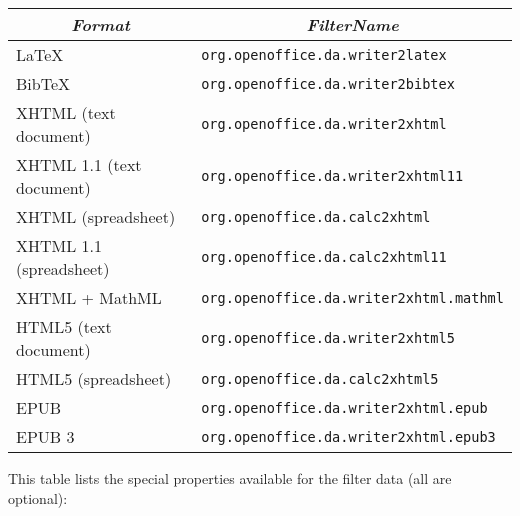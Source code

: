 \documentclass{article}
\newcommand\textstyleSourceText[1]{\texttt{\textmd{#1}}}
\begin{document}
\begin{center}
\begin{tabular}{|l|l|}

\hline
\multicolumn{1}{|c|}{\bfseries\itshape Format} & \multicolumn{1}{c|}{\bfseries\itshape FilterName}\\\hline
\mdseries LaTeX & \mdseries \textstyleSourceText{org.openoffice.da.writer2latex}\\\hline
\mdseries BibTeX & \mdseries \textstyleSourceText{org.openoffice.da.writer2bibtex}\\\hline
\mdseries XHTML (text document) & \mdseries \textstyleSourceText{org.openoffice.da.writer2xhtml}\\\hline
\mdseries XHTML 1.1 (text document) & \mdseries \textstyleSourceText{org.openoffice.da.writer2xhtml11}\\\hline
\mdseries XHTML (spreadsheet) & \mdseries \textstyleSourceText{org.openoffice.da.calc2xhtml}\\\hline
\mdseries XHTML 1.1 (spreadsheet) & \mdseries \textstyleSourceText{org.openoffice.da.calc2xhtml11}\\\hline
\mdseries XHTML + MathML & \mdseries \textstyleSourceText{org.openoffice.da.writer2xhtml.mathml}\\\hline
\mdseries HTML5 (text document) & \mdseries \textstyleSourceText{org.openoffice.da.writer2xhtml5}\\\hline
\mdseries HTML5 (spreadsheet) & \mdseries \textstyleSourceText{org.openoffice.da.calc2xhtml5}\\\hline
\mdseries EPUB & \mdseries \textstyleSourceText{org.openoffice.da.writer2xhtml.epub}\\\hline
EPUB 3 & \textstyleSourceText{org.openoffice.da.writer2xhtml.epub3}\\\hline
\end{tabular}
\end{center}
{\mdseries
This table lists the special properties available for the filter data (all are optional):}
\end{document}
